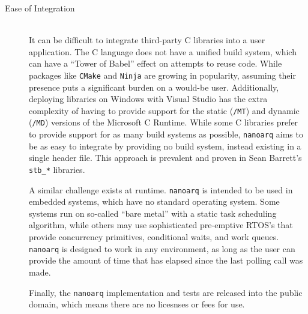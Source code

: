 \documentclass[11pt]{article}
\newcommand{\nanoarq}{\texttt{nanoarq}}
\begin{document}
\begin{description}
\item[Ease of Integration] \hfill \\
    It can be difficult to integrate third-party C libraries into a user application. The C language does not have a unified build system, which can have a \enquote{Tower of Babel} effect on attempts to reuse code. While packages like \texttt{CMake} and \texttt{Ninja} are growing in popularity, assuming their presence puts a significant burden on a would-be user. Additionally, deploying libraries on Windows with Visual Studio has the extra complexity of having to provide support for the static (\texttt{/MT}) and dynamic (\texttt{/MD}) versions of the Microsoft C Runtime. While some C libraries prefer to provide support for as many build systems as possible, \nanoarq{} aims to be as easy to integrate by providing no build system, instead existing in a single header file. This approach is prevalent and proven in Sean Barrett's \texttt{stb\_*} libraries. \par
    A similar challenge exists at runtime. \nanoarq{} is intended to be used in embedded systems, which have no standard operating system. Some systems run on so-called \enquote{bare metal} with a static task scheduling algorithm, while others may use sophisticated pre-emptive RTOS's that provide concurrency primitives, conditional waits, and work queues. \nanoarq{} is designed to work in any environment, as long as the user can provide the amount of time that has elapsed since the last polling call was made. \par
    Finally, the \nanoarq{} implementation and tests are released into the public domain, which means there are no licesnses or fees for use.
\end{description}
\end{document}
